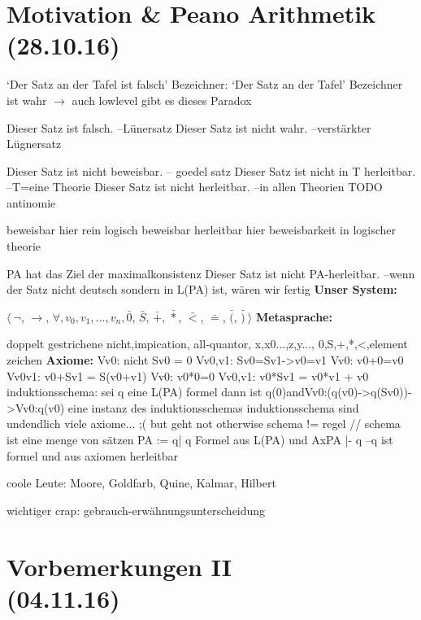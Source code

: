 \documentclass[]{scrartcl}
\begin{document}
\section{Motivation \& Peano Arithmetik\\(28.10.16)}

`Der Satz an der Tafel ist falsch'
Bezeichner: `Der Satz an der Tafel'
Bezeichner ist wahr
$\rightarrow$ auch lowlevel gibt es dieses Paradox

Dieser Satz ist falsch. --Lünersatz
Dieser Satz ist nicht wahr. --verstärkter Lügnersatz

Dieser Satz ist nicht beweisbar. -- goedel satz
Dieser Satz ist nicht in T herleitbar. --T=eine Theorie
Dieser Satz ist nicht herleitbar. --in allen Theorien
TODO antinomie

beweisbar hier rein logisch beweisbar
herleitbar hier beweisbarkeit in logischer theorie

PA hat das Ziel der maximalkonsistenz
Dieser Satz ist nicht PA-herleitbar. --wenn der Satz nicht deutsch sondern in L(PA) ist, wären wir fertig
\newline
\textbf{Unser System:}

$\langle~\neg$, $\rightarrow$, $\forall , v_{0},v_{1}, ... , v_{n}, \bar{0}$, $\bar{S}$, $\bar{+}$, $\bar{*}$, $\bar{<}$, $\bar{=}$, $\bar{(}$, $\bar{)}~\rangle$
\newline
\textbf{Metasprache:}

doppelt gestrichene nicht,impication, all-quantor, x,x0...,z,y..., 0,S,+,*,<,element zeichen
\newline
\textbf{Axiome:}
Vv0: nicht Sv0 = 0
Vv0,v1: Sv0=Sv1->v0=v1
Vv0: v0+0=v0
Vv0v1: v0+Sv1 = S(v0+v1)
Vv0: v0*0=0
Vv0,v1: v0*Sv1 = v0*v1 + v0
induktionsschema: sei q eine L(PA) formel dann ist q(0)andVv0:(q(v0)->q(Sv0))->Vv0:q(v0) eine instanz des induktionsschemas
induktionsschema sind undendlich viele axiome... ;( but geht not otherwise
schema != regel // schema ist eine menge von sätzen 
PA := {q| q Formel aus L(PA) und AxPA |- q} --q ist formel und aus axiomen herleitbar

coole Leute: 
Moore, Goldfarb, Quine, Kalmar, Hilbert

wichtiger crap:
gebrauch-erwähnungsunterscheidung

\section{Vorbemerkungen II\\(04.11.16)}
\end{document}
